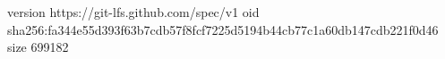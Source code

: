version https://git-lfs.github.com/spec/v1
oid sha256:fa344e55d393f63b7cdb57f8fcf7225d5194b44cb77c1a60db147cdb221f0d46
size 699182
